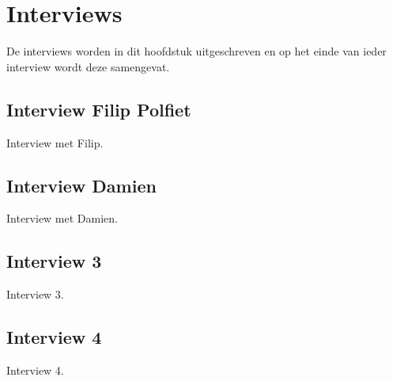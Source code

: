 
\chapter{Interviews}
\label{ch:interviews}

De interviews worden in dit hoofdstuk uitgeschreven en op het einde van ieder interview wordt deze samengevat.

\section{Interview Filip Polfiet}
\label{sec:interview-filip}

Interview met Filip.


\section{Interview Damien}
\label{sec:interview-damien}

Interview met Damien.

\section{Interview 3}
\label{sec:interview-3}

Interview 3.

\section{Interview 4}
\label{sec:interview-4}

Interview 4.